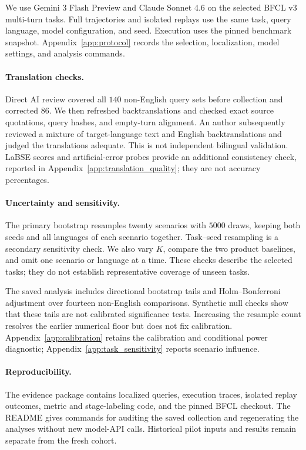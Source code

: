 \documentclass[11pt]{article}
\begin{document}
We use Gemini 3 Flash Preview and Claude Sonnet 4.6 on the selected BFCL v3
multi-turn tasks. Full trajectories and isolated replays use the same task,
query language, model configuration, and seed. Execution uses the pinned
benchmark snapshot. Appendix~\ref{app:protocol} records the selection,
localization, model settings, and analysis commands.

\paragraph{Translation checks.} Direct AI review covered all $140$
non-English query sets before collection and corrected $86$. We then
refreshed backtranslations and checked exact source quotations, query hashes,
and empty-turn alignment. An author subsequently reviewed a mixture of
target-language text and English backtranslations and judged the translations
adequate. This is not independent bilingual validation. LaBSE scores and
artificial-error probes provide an additional consistency check, reported in
Appendix~\ref{app:translation_quality}; they are not accuracy percentages.

\paragraph{Uncertainty and sensitivity.} The primary bootstrap resamples
twenty scenarios with $5000$ draws, keeping both seeds and all languages of
each scenario together. Task--seed resampling is a secondary sensitivity
check. We also vary $K$, compare the two product baselines, and omit one
scenario or language at a time. These checks describe the selected tasks;
they do not establish representative coverage of unseen tasks.

The saved analysis includes directional bootstrap tails and
Holm--Bonferroni adjustment over fourteen non-English comparisons. Synthetic
null checks show that these tails are not calibrated significance tests.
Increasing the resample count resolves the earlier numerical floor but does
not fix calibration. Appendix~\ref{app:calibration} retains the calibration
and conditional power diagnostic; Appendix~\ref{app:task_sensitivity}
reports scenario influence.

\paragraph{Reproducibility.} The evidence package contains localized queries,
execution traces, isolated replay outcomes, metric and stage-labeling code,
and the pinned BFCL checkout. The README gives commands for auditing the
saved collection and regenerating the analyses without new model-API calls.
Historical pilot inputs and results remain separate from the fresh cohort.
\end{document}
